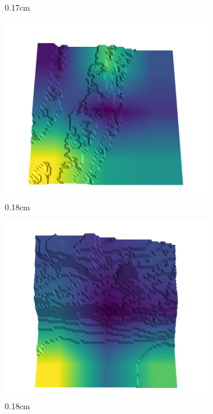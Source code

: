 \begin{figure}[H]
\begin{subfigure}[b]{0.192\linewidth}
\caption{0.17cm}
\label{fig : quarry-false_negative-17}
\end{subfigure}
\begin{subfigure}[b]{0.192\linewidth}
\includegraphics[width=\linewidth]{../img/5/quarry/false_negative/17-patch-3d-majavi-colormap-180.png}
\caption{0.18cm}
\label{fig : quarry-false_negative-18}
\end{subfigure}
\begin{subfigure}[b]{0.192\linewidth}
\includegraphics[width=\linewidth]{../img/5/quarry/false_negative/18-patch-3d-majavi-colormap-190.png}
\caption{0.18cm}
\label{fig : quarry-false_negative-19}
\end{subfigure}
\caption{}
\label{fig : quarry-false_negative}
\end{figure}

